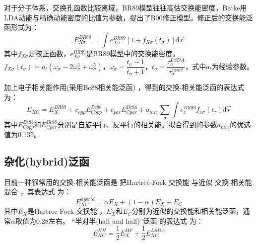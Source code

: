 对于分子体系，交换孔函数比较离域，BR89模型往往高估交换能密度，Becke\linebreak 用LDA动能与精确动能密度的比值为参数，提出了B00修正模型\cite{JCP112-4020_2000}。修正后的交换能泛函形式为：
\begin{equation}
  E_{X\sigma}^{BR89}=\int e_{X\sigma}^{BR89}[1+f_{X\sigma}(t_{\sigma})
  ]\textrm{d}\vec r
  \label{eq:dft-24}
\end{equation}
其中$f_{X\sigma}$是校正函数，$e_{X\sigma}^{BR89}$是BR89模型中的交换能密度。$f_{X\sigma}(t_{\sigma})=a_t(\omega_{\sigma}-2\omega_{\sigma}^3+\omega_{\sigma}^5)$，$\omega_{\sigma}=\dfrac{t_{\sigma}-1}{t_{\sigma}+1}$，$t_{\sigma}=\dfrac{\tau_{\sigma}^{LSDA}}{\tau_{\sigma}^{exact}}$，式中$a_t$为经验参数。

加上{电子}相关{能}作用(采用Bc88相关能泛函\cite{JCP88-1053_1988})
，得到的交换-相关能{泛函的}表达式为：
\begin{equation}
  E_{XC}=E_X^{BR89}+c_{opp}E_{Copp}^{Bc88}+c_{par}E_{Cpar}^{Bc88}+a_{mix}\sum_{\sigma}\int e_x^{BR89}f_{x\sigma}(t_{\tau})\textrm{d}\vec r
  \label{eq:dft-25}
\end{equation}
其中$E_{Copp}^{Bc88}$和$E_{Cpar}^{Bc88}$分别是自旋平行、反平行的相关能。拟合得到的参数$a_{mix}$的优选值为0.135。

\subsection{{杂化(hybrid)}泛函}
{目前}一种很常用的交换-相关能{泛函}是%
把Hartree-Fock%
{交换}能%
与近似%
交换-相关能%
混合%
\cite{JCP104-1040_1996,JCP98-5648_1993}，其表达式%
为：
\begin{equation}
E_{XC}^{hybrid}=\alpha E_X+(1-\alpha)\bar{E}_X+\bar{E}_C
 \label{eq:dft-11}
\end{equation}
其中$E_X$是Hartree-Fock%
{交换}能%
，$\bar{E}_X$和$\bar{E}_C$分别为近似的交换能和相关能泛函，通常$\alpha$取值为0.28左右。%
“半对半(half and half)”泛函\cite{JCP98-1372_1993}%
{的}表达式%
{为}：
\begin{equation}
  E_{XC}^{HH}=\dfrac12E_{X}^{HF}+\dfrac12E_{XC}^{LSDA}
  \label{eq:dft-26}
\end{equation}

